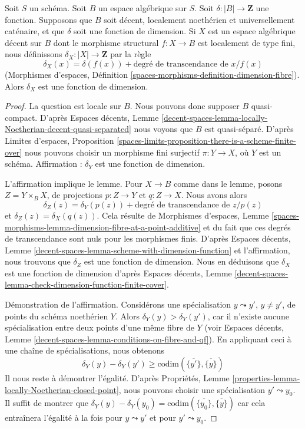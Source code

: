 \begin{lemma}
\label{lemma-universally-catenary-dimension-function}
Soit $S$ un schéma. Soit $B$ un espace algébrique sur $S$.
Soit $\delta : |B| \to \mathbf{Z}$ une fonction.
Supposons que $B$ soit décent, localement noethérien et
universellement caténaire, et que $\delta$ soit une fonction de dimension.
Si $X$ est un espace algébrique décent sur $B$ dont le morphisme structural
$f : X \to B$ est localement de type fini, nous définissons
$\delta_X : |X| \to \mathbf{Z}$ par la règle
$$
\delta_X(x) = \delta(f(x)) + \text{degré de transcendance de }x/f(x)
$$
(Morphismes d'espaces, Définition
\ref{spaces-morphisms-definition-dimension-fibre}).
Alors $\delta_X$ est une fonction de dimension.
\end{lemma}

\begin{proof}
La question est locale sur $B$. Nous pouvons donc supposer $B$ quasi-compact.
D'après Espaces décents, Lemme
\ref{decent-spaces-lemma-locally-Noetherian-decent-quasi-separated}
nous voyons que $B$ est quasi-séparé. D'après
Limites d'espaces, Proposition
\ref{spaces-limits-proposition-there-is-a-scheme-finite-over}
nous pouvons choisir un morphisme fini surjectif $\pi : Y \to X$,
où $Y$ est un schéma.
Affirmation : $\delta_Y$ est une fonction de dimension.

\medskip\noindent
L'affirmation implique le lemme. Pour $X \to B$ comme dans le lemme,
posons $Z = Y \times_B X$, de projections $p : Z \to Y$ et $q : Z \to X$.
Nous avons alors
$$
\delta_Z(z) = \delta_Y(p(z)) + \text{degré de transcendance de }z/p(z)
$$
et $\delta_Z(z) = \delta_X(q(z))$. Cela résulte de
Morphismes d'espaces, Lemme 
\ref{spaces-morphisms-lemma-dimension-fibre-at-a-point-additive}
et du fait que ces degrés de transcendance sont nuls
pour les morphismes finis. D'après Espaces décents, Lemme
\ref{decent-spaces-lemma-scheme-with-dimension-function}
et l'affirmation, nous trouvons que $\delta_Z$ est une fonction de dimension.
Nous en déduisons que $\delta_X$ est une fonction de dimension d'après
Espaces décents, Lemme
\ref{decent-spaces-lemma-check-dimension-function-finite-cover}.

\medskip\noindent
Démonstration de l'affirmation. Considérons une spécialisation $y \leadsto y'$,
$y \not = y'$, de points du schéma noethérien $Y$.
Alors $\delta_Y(y) > \delta_Y(y')$, car il n'existe
aucune spécialisation entre deux points d'une même fibre de $Y$
(voir Espaces décents, Lemme
\ref{decent-spaces-lemma-conditions-on-fibre-and-qf}).
En appliquant ceci à une chaîne de spécialisations, nous obtenons
$$
\delta_Y(y) - \delta_Y(y') \geq
\text{codim}(\overline{\{y'\}}, \overline{\{y\}})
$$
Il nous reste à démontrer l'égalité. D'après
Propriétés, Lemme \ref{properties-lemma-locally-Noetherian-closed-point},
nous pouvons choisir une spécialisation $y' \leadsto y_0$.
Il suffit de montrer que
$\delta_Y(y) - \delta_Y(y_0) =
\text{codim}(\overline{\{y_0\}}, \overline{\{y\}})$
car cela entraînera l'égalité à la fois pour
$y \leadsto y'$ et pour $y' \leadsto y_0$.


\end{proof}
